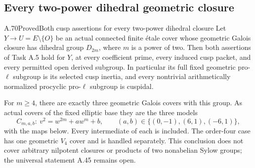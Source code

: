 \subsection{Every two-power dihedral geometric closure}

\begin{statement}{A.70}{Proved}{Both cusp assertions for every two-power dihedral closure}
Let \(Y\to U=E\setminus\{O\}\) be an actual connected finite
\'{e}tale cover whose geometric Galois closure has dihedral group
\(D_{2m}\), where \(m\) is a power of two. Then both assertions
of Task A.5 hold for \(Y\), at every coefficient prime, every
induced cusp packet, and every permitted open derived subgroup.
In particular its full fixed geometric pro-\(\ell\) subgroup is
its selected cusp inertia, and every nontrivial arithmetically
normalized procyclic pro-\(\ell\) subgroup is cuspidal.

For \(m\ge4\), there are exactly three geometric Galois covers
with this group. As actual covers of the fixed elliptic base they
are the three models
\[
 C_{m,a,b}:\ v^2=w^{2m}+aw^m+b,\qquad
 (a,b)\in\{(0,-1),(6,1),(-6,1)\},                 \tag{A.70.1}
\]
with the maps below. Every intermediate of each is included.
The order-four case has one geometric \(V_4\) cover and is
handled separately. This conclusion does not cover arbitrary
nilpotent closures or products of two nonabelian Sylow groups;
the universal statement A.45 remains open.
\end{statement}

